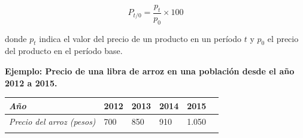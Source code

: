 \documentclass[
]{book}
\begin{document}
\[\begin{equation}
P_{t/0}=\frac{p_{t}}{p_{0}}\times 100
\end{equation}\]

donde \(p_{t}\) indica el valor del precio de un producto en un período \(t\) y \(p_{0}\) el precio del producto en el período base.

\textbf{Ejemplo: Precio de una libra de arroz en una población desde el año 2012 a 2015.}

\begin{longtable}[]{@{}llllll@{}}
\toprule
\begin{minipage}[b]{0.14\columnwidth}\raggedright
\emph{Año}\strut
\end{minipage} & \begin{minipage}[b]{0.11\columnwidth}\raggedright
2012\strut
\end{minipage} & \begin{minipage}[b]{0.13\columnwidth}\raggedright
2013\strut
\end{minipage} & \begin{minipage}[b]{0.16\columnwidth}\raggedright
2014\strut
\end{minipage} & \begin{minipage}[b]{0.14\columnwidth}\raggedright
2015\strut
\end{minipage} & \begin{minipage}[b]{0.14\columnwidth}\raggedright
\strut
\end{minipage}\tabularnewline
\midrule
\endhead
\begin{minipage}[t]{0.14\columnwidth}\raggedright
\emph{Precio del arroz (pesos)}\strut
\end{minipage} & \begin{minipage}[t]{0.11\columnwidth}\raggedright
700\strut
\end{minipage} & \begin{minipage}[t]{0.13\columnwidth}\raggedright
850\strut
\end{minipage} & \begin{minipage}[t]{0.16\columnwidth}\raggedright
910\strut
\end{minipage} & \begin{minipage}[t]{0.14\columnwidth}\raggedright
1.050\strut
\end{minipage} & \begin{minipage}[t]{0.14\columnwidth}\raggedright
\strut
\end{minipage}\tabularnewline
\begin{minipage}[t]{0.14\columnwidth}\raggedright

\end{minipage}
\end{longtable}
\end{document}
